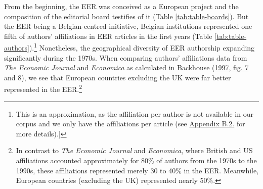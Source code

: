 \documentclass[
  12pt,
  onecolumn]{article}
\begin{document}
From the beginning, the EER was conceived as a European project and the
composition of the editorial board testifies of it (Table
\ref{tab:table-boards}). But the EER being a Belgian-centred initiative,
Belgian institutions represented one fifth of authors' affiliations in
EER articles in the first years (Table
\ref{tab:table-authors}).\footnote{This is an approximation, as the
  affiliation per author is not available in our corpus and we only have
  the affiliations per article (see
  \protect\hyperlink{author-affiliation}{Appendix B.2.} for more
  details).{]}} Nonetheless, the geographical diversity of EER
authorship expanding significantly during the 1970s. When comparing
authors' affiliations data from \emph{The Economic Journal} and
\emph{Economica} as calculated in Backhouse
(\protect\hyperlink{ref-backhouse1997a}{1997, fig. 7} and 8), we see
that European countries excluding the UK were far better represented in
the EER.\footnote{In contrast to \emph{The Economic Journal} and
  \emph{Economica}, where British and US affiliations accounted
  approximately for 80\% of authors from the 1970s to the 1990s, these
  affiliations represented merely 30 to 40\% in the EER. Meanwhile,
  European countries (excluding the UK) represented nearly 50\%.}
\end{document}
